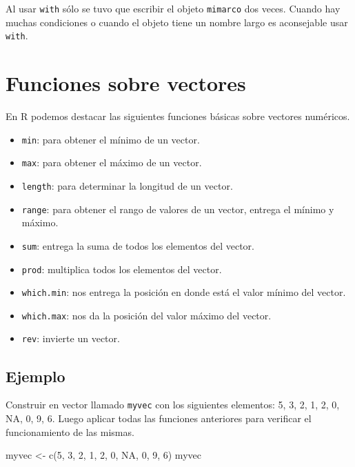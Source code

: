 \documentclass[
]{book}
\makeatletter
\newenvironment{Shaded}{\begin{snugshade}}{\end{snugshade}}
\newcommand{\ConstantTok}[1]{\textcolor[rgb]{0.00,0.00,0.00}{#1}}
\newcommand{\DecValTok}[1]{\textcolor[rgb]{0.00,0.00,0.81}{#1}}
\newcommand{\FunctionTok}[1]{\textcolor[rgb]{0.00,0.00,0.00}{#1}}
\newcommand{\NormalTok}[1]{#1}
\newcommand{\OtherTok}[1]{\textcolor[rgb]{0.56,0.35,0.01}{#1}}
\providecommand{\tightlist}{%
  \setlength{\itemsep}{0pt}\setlength{\parskip}{0pt}}
\newenvironment{kframe}{%
\medskip{}
\setlength{\fboxsep}{.8em}
 \def\at@end@of@kframe{}%
 \ifinner\ifhmode%
  \def\at@end@of@kframe{\end{minipage}}%
  \begin{minipage}{\columnwidth}%
 \fi\fi%
 \def\FrameCommand##1{\hskip\@totalleftmargin \hskip-\fboxsep
 \colorbox{shadecolor}{##1}\hskip-\fboxsep
     \hskip-\linewidth \hskip-\@totalleftmargin \hskip\columnwidth}%
 \MakeFramed {\advance\hsize-\width
   \@totalleftmargin\z@ \linewidth\hsize
   \@setminipage}}%
 {\par\unskip\endMakeFramed%
 \at@end@of@kframe}
\renewenvironment{Shaded}{\begin{kframe}}{\end{kframe}}
\makeatother
\begin{document}
Al usar \texttt{with} sólo se tuvo que escribir el objeto \texttt{mimarco} dos veces. Cuando hay muchas condiciones o cuando el objeto tiene un nombre largo es aconsejable usar \texttt{with}.

\hypertarget{funciones-sobre-vectores}{%
\section{Funciones sobre vectores}\label{funciones-sobre-vectores}}

En R podemos destacar las siguientes funciones básicas sobre vectores numéricos.

\begin{itemize}
\tightlist
\item
  \texttt{min}: para obtener el mínimo de un vector.
\item
  \texttt{max}: para obtener el máximo de un vector.
\item
  \texttt{length}: para determinar la longitud de un vector.
\item
  \texttt{range}: para obtener el rango de valores de un vector, entrega el mínimo y máximo.
\item
  \texttt{sum}: entrega la suma de todos los elementos del vector.
\item
  \texttt{prod}: multiplica todos los elementos del vector.
\item
  \texttt{which.min}: nos entrega la posición en donde está el valor mínimo del vector.
\item
  \texttt{which.max}: nos da la posición del valor máximo del vector.
\item
  \texttt{rev}: invierte un vector.
\end{itemize}

\hypertarget{ejemplo-9}{%
\subsection*{Ejemplo}\label{ejemplo-9}}

Construir en vector llamado \texttt{myvec} con los siguientes elementos: 5, 3, 2, 1, 2, 0, NA, 0, 9, 6. Luego aplicar todas las funciones anteriores para verificar el funcionamiento de las mismas.

\begin{Shaded}
\begin{Highlighting}[]
\NormalTok{myvec }\OtherTok{\textless{}{-}} \FunctionTok{c}\NormalTok{(}\DecValTok{5}\NormalTok{, }\DecValTok{3}\NormalTok{, }\DecValTok{2}\NormalTok{, }\DecValTok{1}\NormalTok{, }\DecValTok{2}\NormalTok{, }\DecValTok{0}\NormalTok{, }\ConstantTok{NA}\NormalTok{, }\DecValTok{0}\NormalTok{, }\DecValTok{9}\NormalTok{, }\DecValTok{6}\NormalTok{)}
\NormalTok{myvec}
\end{Highlighting}
\end{Shaded}
\end{document}
